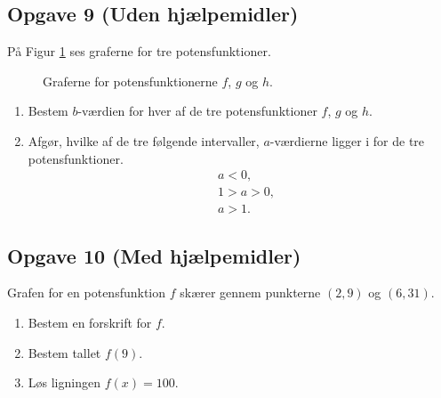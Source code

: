 \documentclass[12pt]{article}
\begin{document}
\subsection*{Opgave 9 (Uden hjælpemidler)}
På Figur \ref{fig:potens} ses graferne for tre potensfunktioner.
\begin{figure}[H]
	\centering
	\caption{Graferne for potensfunktionerne $f$, $g$ og $h$.}
	\label{fig:potens}
\end{figure}
\begin{enumerate}[label=\roman*)]
	\item Bestem $b$-værdien for hver af de tre potensfunktioner $f$, $g$ og $h$. 
	\item Afgør, hvilke af de tre følgende intervaller, $a$-værdierne ligger i for de tre potensfunktioner. 
	\begin{align*}
		&a < 0,\\
		&1 > a > 0,\\
		&a > 1.
	\end{align*}
\end{enumerate}

\subsection*{Opgave 10 (Med hjælpemidler)}
Grafen for en potensfunktion $f$ skærer gennem punkterne $(2,9)$ og $(6,31)$. 
\begin{enumerate}[label=\roman*)]
	\item Bestem en forskrift for $f$. 
	\item Bestem tallet $f(9)$. 
	\item Løs ligningen $f(x) = 100$.
\end{enumerate}
\end{document}

